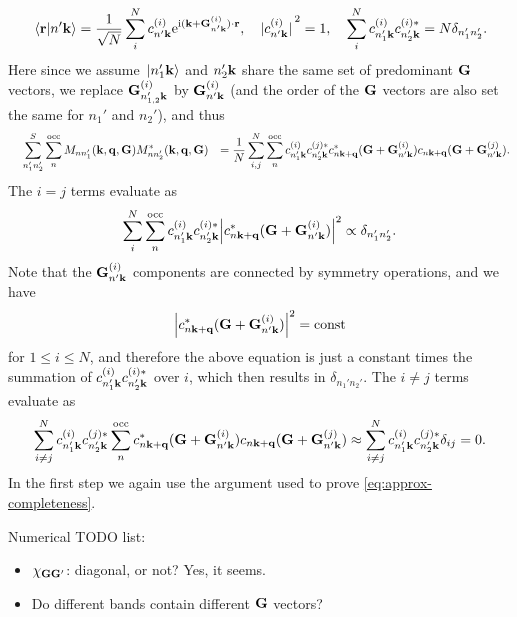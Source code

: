 \documentclass[hyperref, a4paper]{article}
\newcommand*{\ii}{\mathrm{i}}
\newcommand*{\ee}{\mathrm{e}}
\newcommand*{\const}{\mathrm{const}}
\def\\{}%
\begin{document}
\begin{equation}
    \braket*{\vb{r}}{n' \vb{k}} = \frac{1}{\sqrt{N}} \sum_i^N 
    c_{n' \vb{k}}^{(i)} \ee^{\ii (\vb{k} + \vb{G}^{(i)}_{n' \vb{k}}) \cdot \vb{r}}, \quad 
    \abs*{c_{n' \vb{k}}^{(i)}}^2 = 1, \quad 
    \sum_{i}^{N} c^{(i)}_{n'_1 \vb{k}} c^{(i)*}_{n'_2 \vb{k}} = N \delta_{n'_1 n'_2}.
\end{equation}
Here since we assume $\ket*{n_1' \vb{k}}$ and $n_2' \vb{k}$ 
share the same set of predominant $\vb{G}$ vectors, 
we replace $\vb{G}^{(i)}_{n'_{1, 2} \vb{k}}$ by $\vb{G}^{(i)}_{n' \vb{k}}$
(and the order of the $\vb{G}$ vectors are also set the same for $n_1'$ and $n_2'$), 
and thus 
\begin{equation}
    \begin{aligned}
    &\quad \sum_{n_1'n _2'}^S \sum_n^{\text{occ}} M_{n n'_1} (\vb{k}, \vb{q}, \vb{G}) M^*_{n n'_2} (\vb{k}, \vb{q}, \vb{G}) \\
    &= \frac{1}{N} \sum_{i, j}^N \sum_{n}^{\text{occ}} 
    c^{(i)}_{n'_1 \vb{k}} c^{(j) *}_{n'_2 \vb{k}}
    c_{n \vb{k} + \vb{q}}^*(\vb{G} + \vb{G}^{(i)}_{n' \vb{k}})
    c_{n \vb{k} + \vb{q}}  (\vb{G} + \vb{G}^{(j)}_{n' \vb{k}}) .
    \end{aligned}
\end{equation}
The $i = j$ terms evaluate as 
\begin{equation}
    \sum_{i}^N \sum_{n}^{\text{occ}} 
    c^{(i)}_{n'_1 \vb{k}} c^{(i) *}_{n'_2 \vb{k}}
    \abs{c_{n \vb{k} + \vb{q}}^*(\vb{G} + \vb{G}^{(i)}_{n' \vb{k}})}^2 \propto \delta_{n_1' n_2'}.
\end{equation}
Note that the $\vb{G}^{(i)}_{n' \vb{k}}$ components are connected by symmetry operations, 
and we have 
\[
    \abs{c_{n \vb{k} + \vb{q}}^*(\vb{G} + \vb{G}^{(i)}_{n' \vb{k}})}^2 = \const
\]
for $1 \leq i \leq N$, 
and therefore the above equation is just a constant times 
the summation of $c^{(i)}_{n'_1 \vb{k}} c^{(i) *}_{n'_2 \vb{k}}$ over $i$, 
which then results in $\delta_{n_1' n_2'}$.
The $i \neq j$ terms evaluate as 
\[
    \sum_{i \neq j}^N 
    c^{(i)}_{n'_1 \vb{k}} c^{(j) *}_{n'_2 \vb{k}}
    \sum_{n}^{\text{occ}} 
    c_{n \vb{k} + \vb{q}}^*(\vb{G} + \vb{G}^{(i)}_{n' \vb{k}})
    c_{n \vb{k} + \vb{q}}  (\vb{G} + \vb{G}^{(j)}_{n' \vb{k}}) 
    \approx \sum_{i \neq j}^N  c^{(i)}_{n'_1 \vb{k}} c^{(j) *}_{n'_2 \vb{k}} \delta_{ij} = 0.
\]
In the first step we again use the argument used to prove \eqref{eq:approx-completeness}.


Numerical TODO list: 
\begin{itemize}
    \item $\chi_{\vb{G} \vb{G}'}$: diagonal, or not? Yes, it seems.
    \item Do different bands contain different $\vb{G}$ vectors?
\end{itemize}
\end{document}
